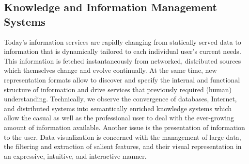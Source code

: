 \subsection{Knowledge and Information Management Systems}


Today's information services are rapidly changing from statically served data to
information that is dynamically tailored to each individual user's current needs. This
information is fetched instantaneously from networked, distributed sources which
themselves change and evolve continually. At the same time, new representation formats
allow to discover and specify the internal and functional structure of information and
drive services that previously required (human) understanding. Technically, we observe the
convergence of databases, Internet, and distributed systems into semantically enriched
knowledge systems which allow the casual as well as the professional user to deal with the
ever-growing amount of information available.  Another issue is the presentation of
information to the user.  Data visualization is concerned with the management of large
data, the filtering and extraction of salient features, and their visual representation in
an expressive, intuitive, and interactive manner.

